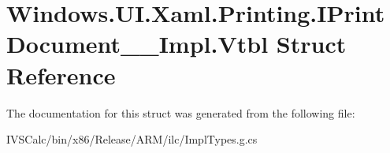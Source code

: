 \hypertarget{struct_windows_1_1_u_i_1_1_xaml_1_1_printing_1_1_i_print_document_____impl_1_1_vtbl}{}\section{Windows.\+U\+I.\+Xaml.\+Printing.\+I\+Print\+Document\+\_\+\+\_\+\+Impl.\+Vtbl Struct Reference}
\label{struct_windows_1_1_u_i_1_1_xaml_1_1_printing_1_1_i_print_document_____impl_1_1_vtbl}


The documentation for this struct was generated from the following file\+:\begin{DoxyCompactItemize}
\item 
I\+V\+S\+Calc/bin/x86/\+Release/\+A\+R\+M/ilc/Impl\+Types.\+g.\+cs\end{DoxyCompactItemize}
